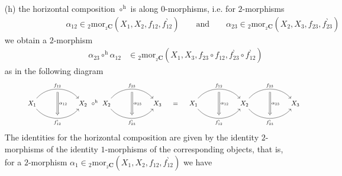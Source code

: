 \begin{enumerate}
\begin{enumerate}
\begin{enumerate}
\item[(h)]
the horizontal composition $\circ^{\mathrm{h}}$ is along $0$-morphisms, i.e. for $2$-morphisms
\begin{align*}
\hspace{7em}
  \alpha_{12}
  \in
  {_{2}}\mathrm{mor}_{{_{2}\mathbf{C}}}
  \left(
    X_{1}
    ,
    X_{2}
    ,
    f_{12}
    ,
    f_{12}^{\backprime}
  \right)
  \qquad
  \text{and}
  \qquad
  \alpha_{23}
  \in
  {_{2}}\mathrm{mor}_{{_{2}\mathbf{C}}}
  \left(
    X_{2}
    ,
    X_{3}
    ,
    f_{23}
    ,
    f_{23}^{\backprime}
  \right)
\end{align*}
we obtain a $2$-morphism
\begin{align*}
\hspace{7em}
  \alpha_{23}
  \circ^{\mathrm{h}}
  \alpha_{12}
  &\in
  {_{2}}\mathrm{mor}_{{_{2}\mathbf{C}}}
  \left(
    X_{1}
    ,
    X_{3}
    ,
    f_{23} \circ f_{12}
    ,
    f_{23}^{\backprime}
    \circ
    f_{12}^{\backprime}
  \right)
\end{align*}
as in the following diagram
\begin{equation*}
\hspace{3em}
\begin{tikzcd}[row sep=2.4em,column sep=5.6em]
  X_{1}
  \ar[bend left=50]{r}[swap,name=U1]{}{f_{12}}
  \ar[bend right=50]{r}[name=D1]{}[swap]{f_{12}^{\backprime}}
  &
  X_{2}
  \ar[Rightarrow,from=U1,to=D1,"\alpha_{12}"]
\end{tikzcd}
  \circ^{\mathrm{h}}
\begin{tikzcd}[row sep=2.4em,column sep=5.6em]
  X_{2}
  \ar[bend left=50]{r}[swap,name=U2]{}{f_{23}}
  \ar[bend right=50]{r}[name=D2]{}[swap]{f_{23}^{\backprime}}
  &
  X_{3}
  \ar[Rightarrow,from=U2,to=D2,"\alpha_{23}"]
\end{tikzcd}
  \quad
  =
  \quad
\begin{tikzcd}[row sep=2.4em,column sep=5.6em]
  X_{1}
  \ar[bend left=50]{r}[swap,name=U1]{}{f_{12}}
  \ar[bend right=50]{r}[name=D1]{}[swap]{f_{12}^{\backprime}}
  &
  X_{2}
  \ar[Rightarrow,from=U1,to=D1,"\alpha_{12}"]
  \ar[bend left=50]{r}[swap,name=U2]{}{f_{23}}
  \ar[bend right=50]{r}[name=D2]{}[swap]{f_{23}^{\backprime}}
  &
  X_{3}
  \ar[Rightarrow,from=U2,to=D2,"\alpha_{23}"]
\end{tikzcd}
\end{equation*}
The identities for the horizontal composition are given by the identity $2$-morphisms of the identity $1$-morphisms of the corresponding objects, that is, for a $2$-morphism $\alpha_{1} \in {_{2}}\mathrm{mor}_{{_{2}\mathbf{C}}}(X_{1},X_{2},f_{12},f_{12}^{\backprime})$ we have

\end{enumerate}
\end{enumerate}
\end{enumerate}
